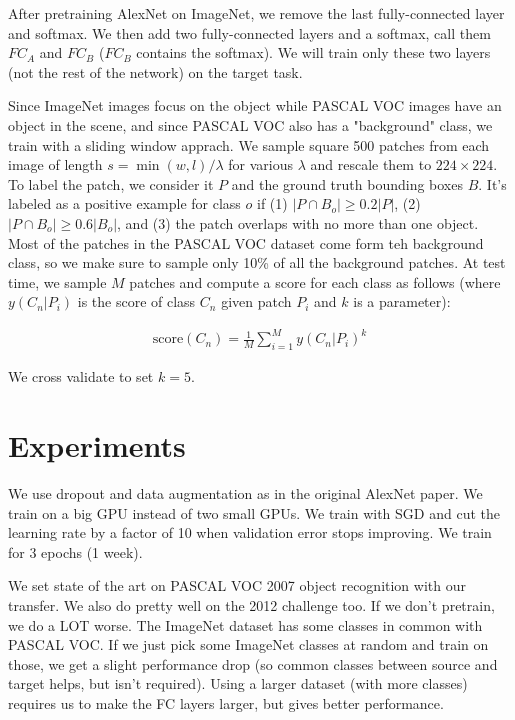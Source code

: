 \documentclass[a4paper]{article}
\begin{document}
After pretraining AlexNet on ImageNet, we remove the last fully-connected layer
and softmax. We then add two fully-connected layers and a softmax, call them
$FC_A$ and $FC_B$ ($FC_B$ contains the softmax). We will train only these
two layers (not the rest of the network) on the target task.

Since ImageNet images focus on the object while PASCAL VOC images have an
object in the scene, and since PASCAL VOC also has a "background" class, we
train with a sliding window apprach. We sample square 500 patches from each
image of length $s = \min(w, l)/\lambda$ for various $\lambda$ and rescale
them to $224 \times 224$. To label the patch, we consider it $P$ and the
ground truth bounding boxes $B$. It's labeled as a positive example for class
$o$ if (1) $|P \cap B_o| \geq 0.2 |P|$, (2) $|P \cap B_o| \geq 0.6 |B_o|$,
and (3) the patch overlaps with no more than one object. Most of the patches
in the PASCAL VOC dataset come form teh background class, so we make sure
to sample only 10\% of all the background patches. At test time, we sample $M$
patches and compute a score for each class as follows (where $y(C_n | P_i)$ is
the score of class $C_n$ given patch $P_i$ and $k$ is a parameter):

\begin{align}
  \text{score}(C_n) = \frac{1}{M} \sum_{i=1}^{M}{y(C_n | P_i)^k}
\end{align}

We cross validate to set $k = 5$.

\section{Experiments}
We use dropout and data augmentation as in the original AlexNet paper. We train
on a big GPU instead of two small GPUs. We train with SGD and cut the learning
rate by a factor of 10 when validation error stops improving. We train for
3 epochs (1 week).

We set state of the art on PASCAL VOC 2007 object recognition with our transfer.
We also do pretty well on the 2012 challenge too. If we don't pretrain, we
do a LOT worse. The ImageNet dataset has some classes in common with PASCAL
VOC. If we just pick some ImageNet classes at random and train on those,
we get a slight performance drop (so common classes between source and target
helps, but isn't required). Using a larger dataset (with more classes) requires
us to make the FC layers larger, but gives better performance.
\end{document}
